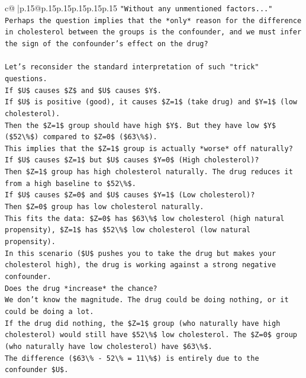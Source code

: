 \documentclass{article}
\begin{document}
{\begin{supertabular}{c@{$\;$}|p{.15\linewidth}@{}p{.15\linewidth}p{.15\linewidth}p{.15\linewidth}p{.15\linewidth}p{.15\linewidth}}
{{{\texttt{"Without any unmentioned factors..."} \\
\texttt{Perhaps the question implies that the *only* reason for the difference in cholesterol between the groups is the confounder, and we must infer the sign of the confounder's effect on the drug?} \\
\\ 
\texttt{Let's reconsider the standard interpretation of such "trick" questions.} \\
\texttt{If \$U\$ causes \$Z\$ and \$U\$ causes \$Y\$.} \\
\texttt{If \$U\$ is positive (good), it causes \$Z=1\$ (take drug) and \$Y=1\$ (low cholesterol).} \\
\texttt{Then the \$Z=1\$ group should have high \$Y\$. But they have low \$Y\$ (\$52\textbackslash{}\%\$) compared to \$Z=0\$ (\$63\textbackslash{}\%\$).} \\
\texttt{This implies that the \$Z=1\$ group is actually *worse* off naturally?} \\
\texttt{If \$U\$ causes \$Z=1\$ but \$U\$ causes \$Y=0\$ (High cholesterol)?} \\
\texttt{Then \$Z=1\$ group has high cholesterol naturally. The drug reduces it from a high baseline to \$52\textbackslash{}\%\$.} \\
\texttt{If \$U\$ causes \$Z=0\$ and \$U\$ causes \$Y=1\$ (Low cholesterol)?} \\
\texttt{Then \$Z=0\$ group has low cholesterol naturally.} \\
\texttt{This fits the data: \$Z=0\$ has \$63\textbackslash{}\%\$ low cholesterol (high natural propensity), \$Z=1\$ has \$52\textbackslash{}\%\$ low cholesterol (low natural propensity).} \\
\texttt{In this scenario (\$U\$ pushes you to take the drug but makes your cholesterol high), the drug is working against a strong negative confounder.} \\
\texttt{Does the drug *increase* the chance?} \\
\texttt{We don't know the magnitude. The drug could be doing nothing, or it could be doing a lot.} \\
\texttt{If the drug did nothing, the \$Z=1\$ group (who naturally have high cholesterol) would still have \$52\textbackslash{}\%\$ low cholesterol. The \$Z=0\$ group (who naturally have low cholesterol) have \$63\textbackslash{}\%\$.} \\
\texttt{The difference (\$63\textbackslash{}\% {-} 52\textbackslash{}\% = 11\textbackslash{}\%\$) is entirely due to the confounder \$U\$.} \\
}}}
\end{supertabular}}
\end{document}
